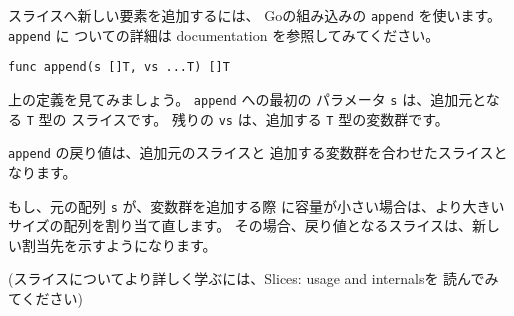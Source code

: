 スライスへ新しい要素を追加するには、
Goの組み込みの \texttt{append} を使います。 \texttt{append} に
ついての詳細は documentation を参照してみてください。

\begin{lstlisting}[numbers=none]
func append(s []T, vs ...T) []T
\end{lstlisting}

上の定義を見てみましょう。 \texttt{append} への最初の
パラメータ \texttt{s} は、追加元となる \texttt{T} 型の
スライスです。 残りの \texttt{vs} は、追加する \texttt{T} 型の変数群です。

\texttt{append} の戻り値は、追加元のスライスと
追加する変数群を合わせたスライスとなります。

もし、元の配列 \texttt{s} が、変数群を追加する際
に容量が小さい場合は、より大きいサイズの配列を割り当て直します。
その場合、戻り値となるスライスは、新しい割当先を示すようになります。

(スライスについてより詳しく学ぶには、Slices: usage and internalsを
読んでみてください)